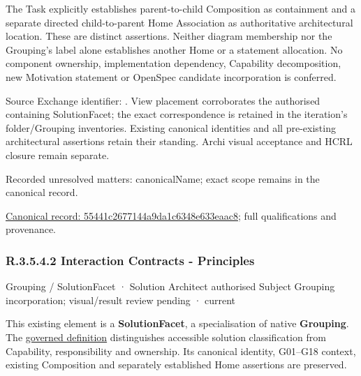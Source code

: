 The Task explicitly establishes parent-to-child Composition as containment and
a separate directed child-to-parent Home Association as authoritative architectural
location. These are distinct assertions. Neither diagram membership nor the
Grouping's label alone establishes another Home or a statement allocation.
No component ownership, implementation dependency, Capability decomposition,
new Motivation statement or OpenSpec candidate incorporation is conferred.



Source Exchange identifier: \texttt{}. View placement corroborates
the authorised containing SolutionFacet; the exact correspondence is retained in the
iteration's folder/Grouping inventories. Existing canonical identities and all
pre-existing architectural assertions retain their standing. Archi visual
acceptance and HCRL closure remain separate.


{\small Recorded unresolved matters: canonicalName; exact scope remains in the canonical record.}\par
{\footnotesize \href{../../../../../../../continuum/grouping/55441c2677144a9da1c6348e633eaac8.md}{Canonical record: 55441c2677144a9da1c6348e633eaac8}; full qualifications and provenance.}\par
\subsubsection*{R.3.5.4.2 Interaction Contracts - Principles}
\label{navigation:R.3.5.4.2}

\label{element:d8d1f0aeff354b2696d3d6475c44c36e}
{\small Grouping / SolutionFacet · Solution Architect authorised Subject Grouping incorporation; visual/result review pending · current}\par

This existing element is a \textbf{SolutionFacet}, a specialisation of native
\textbf{Grouping}. The \href{\detokenize{../../../../../../../governance/continuum-representation.md#solutionfacet-classification--1119-candidate}}{governed definition}
distinguishes accessible solution classification from Capability, responsibility
and ownership. Its canonical identity, G01–G18 context, existing Composition
and separately established Home assertions are preserved.



